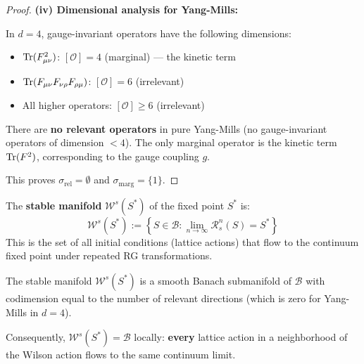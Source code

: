 \begin{proof}
\textbf{(iv) Dimensional analysis for Yang-Mills:}

In $d = 4$, gauge-invariant operators have the following dimensions:
\begin{itemize}
\item $\operatorname{Tr}(F_{\mu\nu}^2)$: $[\mathcal{O}] = 4$ (marginal) --- the kinetic term
\item $\operatorname{Tr}(F_{\mu\nu} F_{\nu\rho} F_{\rho\mu})$: $[\mathcal{O}] = 6$ (irrelevant)
\item All higher operators: $[\mathcal{O}] \geq 6$ (irrelevant)
\end{itemize}

There are \textbf{no relevant operators} in pure Yang-Mills (no gauge-invariant 
operators of dimension $< 4$). The only marginal operator is the kinetic 
term $\operatorname{Tr}(F^2)$, corresponding to the gauge coupling $g$.

This proves $\sigma_{\text{rel}} = \emptyset$ and $\sigma_{\text{marg}} = \{1\}$.
\end{proof}

\begin{definition}
\label{def:stable-manifold}
The \textbf{stable manifold} $\mathcal{W}^s(S^*)$ of the fixed point $S^*$ is:
\[
\mathcal{W}^s(S^*) := \left\{ S \in \mathcal{B} : \lim_{n \to \infty} \mathcal{R}_s^n(S) = S^* \right\}
\]
This is the set of all initial conditions (lattice actions) that flow to the 
continuum fixed point under repeated RG transformations.
\end{definition}

\begin{theorem}
\label{thm:stable-manifold}
The stable manifold $\mathcal{W}^s(S^*)$ is a smooth Banach submanifold of 
$\mathcal{B}$ with codimension equal to the number of relevant directions 
(which is zero for Yang-Mills in $d = 4$).

Consequently, $\mathcal{W}^s(S^*) = \mathcal{B}$ locally: \textbf{every} 
lattice action in a neighborhood of the Wilson action flows to the same 
continuum limit.
\end{theorem}

